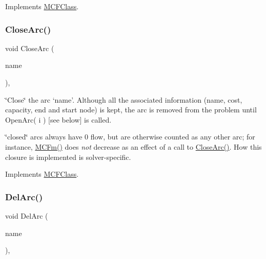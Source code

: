Implements \mbox{\hyperlink{class_m_c_f_class_ad548db90d9914f8a40bbb4823f274ccc}{M\+C\+F\+Class}}.

\mbox{\label{class_m_c_f_cplex_a4a964ce79159307998f5acd0018d01b1}} 
\subsubsection{\texorpdfstring{Close\+Arc()}{CloseArc()}}
{\footnotesize\ttfamily void Close\+Arc (\begin{DoxyParamCaption}\item[{\mbox{\hyperlink{class_m_c_f_class_a76aaabb20535c51a2752b93f6c38fe54}{c\+Index}}}]{name }\end{DoxyParamCaption})\hspace{0.3cm}{\ttfamily [override]}, {\ttfamily [virtual]}}

\char`\"{}\+Close\char`\"{} the arc `name'. Although all the associated information (name, cost, capacity, end and start node) is kept, the arc is removed from the problem until Open\+Arc( i ) \mbox{[}see below\mbox{]} is called.

\char`\"{}closed\char`\"{} arcs always have 0 flow, but are otherwise counted as any other arc; for instance, \mbox{\hyperlink{class_m_c_f_class_ab4d5a0d0fc49882de0b4eb3146f1b7a6}{M\+C\+Fm()}} does {\itshape not} decrease as an effect of a call to \mbox{\hyperlink{class_m_c_f_cplex_a4a964ce79159307998f5acd0018d01b1}{Close\+Arc()}}. How this closure is implemented is solver-\/specific. 

Implements \mbox{\hyperlink{class_m_c_f_class_ae1c33ba491b57343fbc157123fff5b11}{M\+C\+F\+Class}}.

\mbox{\label{class_m_c_f_cplex_a3b6145c95b83f40a76d724eb2b92f80f}} 
\subsubsection{\texorpdfstring{Del\+Arc()}{DelArc()}}
{\footnotesize\ttfamily void Del\+Arc (\begin{DoxyParamCaption}\item[{\mbox{\hyperlink{class_m_c_f_class_a76aaabb20535c51a2752b93f6c38fe54}{c\+Index}}}]{name }\end{DoxyParamCaption})\hspace{0.3cm}{\ttfamily [override]}, {\ttfamily [virtual]}}

